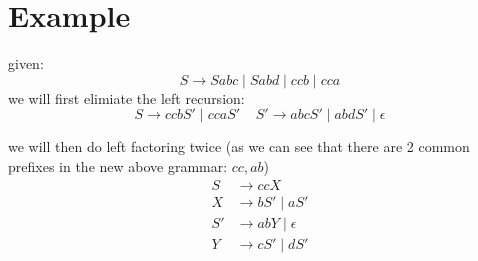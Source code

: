 \documentclass[12pt]{book}
\begin{document}
\section*{Example}
given:
\[S \to Sabc \mid Sabd \mid ccb \mid cca\]
we will first elimiate the left recursion:
\[S \to ccbS' \mid ccaS'\;\;\;\;S' \to abcS' \mid abdS' \mid \epsilon\]

we will then do left factoring twice (as we can see that there are 2 common prefixes in the new above grammar: $cc, ab$)
\[ \;\;\;\; \]
\begin{align*}
        S &\to ccX\\
        X &\to bS' \mid aS'\\
        S' &\to abY \mid \epsilon \\
        Y &\to cS' \mid dS'
\end{align*}
\end{document}

